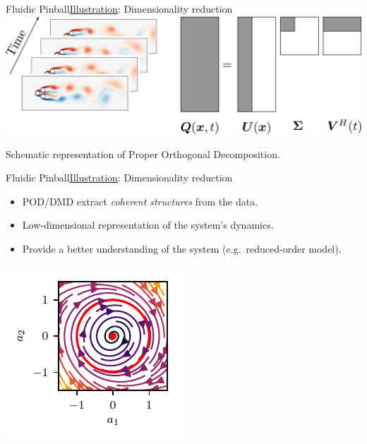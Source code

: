 \documentclass[usenames,dvipsnames,svgnames,10pt,aspectratio=169]{beamer}
\begin{document}
\begin{frame}[t, c]{Fluidic Pinball}{\underline{Illustration}: Dimensionality reduction}
	\centering
	\includegraphics[width=.8\textwidth]{dimensionality_reduction_pinball}

	\bigskip

	Schematic representation of Proper Orthogonal Decomposition.
	\vspace{1cm}
\end{frame}

\begin{frame}[t, c]{Fluidic Pinball}{\underline{Illustration}: Dimensionality reduction}
	\begin{minipage}{.48\textwidth}
		\begin{itemize}
			\item POD/DMD extract \emph{coherent structures} from the data.
			\bigskip
			\item Low-dimensional representation of the system's dynamics.
			\bigskip
			\item Provide a better understanding of the system (e.g.\ reduced-order model).
		\end{itemize}
	\end{minipage}%
	\hfill
	\begin{minipage}{.48\textwidth}
		\centering
		\includegraphics[width=.8\textwidth]{pinball_phase_plane}
	\end{minipage}

	\vspace{1cm}
\end{frame}
\end{document}
